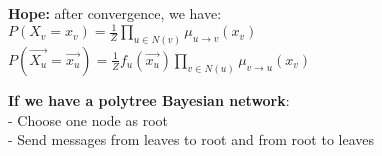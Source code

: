 \textbf{Hope:} after convergence, we have:\\
$P(X_v=x_v)=\frac{1}{Z}\prod_{u \in N(v)}\mu_{u\rightarrow v}(x_v)$\\
$P(\overrightarrow{X_u}=\overrightarrow{x_u})=\frac{1}{Z} f_u(\overrightarrow{x_u})\prod_{v\in N(u)}\mu_{v\rightarrow u}(x_v)$

\textbf{If we have a polytree Bayesian network}:\\
- Choose one node as root\\
- Send messages from leaves to root and from root to leaves\\
